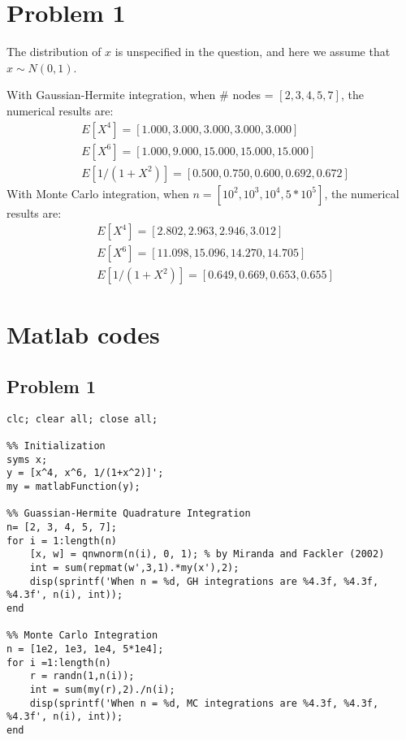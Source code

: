 \documentclass[11pt]{article}
\begin{document}
\section*{Problem 1}

The distribution of $x$ is unspecified in the question, and here we assume that $x \sim N(0,1)$.

With Gaussian-Hermite integration, when \# nodes = $[2, 3, 4, 5, 7]$, the numerical results are:
\begin{align*}
& E[X^4] = [1.000, 3.000, 3.000, 3.000, 3.000]\\
& E[X^6] = [1.000, 9.000, 15.000, 15.000, 15.000]\\
& E[1/(1+X^2)] = [0.500, 0.750, 0.600, 0.692, 0.672]
\end{align*}
With Monte Carlo integration, when $n = [10^2, 10^3, 10^4, 5*10^5]$, the numerical results are:
\begin{align*}
& E[X^4] = [2.802, 2.963, 2.946, 3.012]\\
& E[X^6] = [11.098,  15.096, 14.270, 14.705]\\
& E[1/(1+X^2)] = [0.649, 0.669, 0.653, 0.655]
\end{align*}

\appendix

\section*{Matlab codes}

\subsection*{Problem 1}

\begin{lstlisting}[style=Matlab-editor]
clc; clear all; close all;

%% Initialization
syms x;
y = [x^4, x^6, 1/(1+x^2)]';
my = matlabFunction(y);

%% Guassian-Hermite Quadrature Integration
n= [2, 3, 4, 5, 7];
for i = 1:length(n)
    [x, w] = qnwnorm(n(i), 0, 1); % by Miranda and Fackler (2002)
    int = sum(repmat(w',3,1).*my(x'),2);
    disp(sprintf('When n = %d, GH integrations are %4.3f, %4.3f, %4.3f', n(i), int));
end

%% Monte Carlo Integration
n = [1e2, 1e3, 1e4, 5*1e4];
for i =1:length(n)
    r = randn(1,n(i));
    int = sum(my(r),2)./n(i);
    disp(sprintf('When n = %d, MC integrations are %4.3f, %4.3f, %4.3f', n(i), int));
end
\end{lstlisting}
\end{document}
